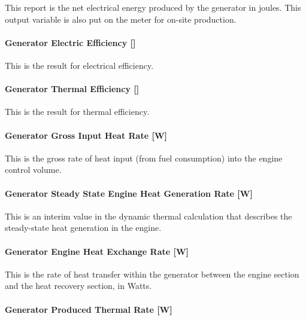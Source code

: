 This report is the net electrical energy produced by the generator in joules. This output variable is also put on the meter for on-site production.

\paragraph{Generator Electric Efficiency {[]}}\label{generator-electric-efficiency}

This is the result for electrical efficiency.

\paragraph{Generator Thermal Efficiency {[]}}\label{generator-thermal-efficiency}

This is the result for thermal efficiency.

\paragraph{Generator Gross Input Heat Rate {[}W{]}}\label{generator-gross-input-heat-rate-w}

This is the gross rate of heat input (from fuel consumption) into the engine control volume.

\paragraph{Generator Steady State Engine Heat Generation Rate {[}W{]}}\label{generator-steady-state-engine-heat-generation-rate-w}

This is an interim value in the dynamic thermal calculation that describes the steady-state heat generation in the engine.

\paragraph{Generator Engine Heat Exchange Rate {[}W{]}}\label{generator-engine-heat-exchange-rate-w}

This is the rate of heat transfer within the generator between the engine section and the heat recovery section, in Watts.

\paragraph{Generator Produced Thermal Rate {[}W{]}}\label{generator-produced-thermal-rate-w-2}

